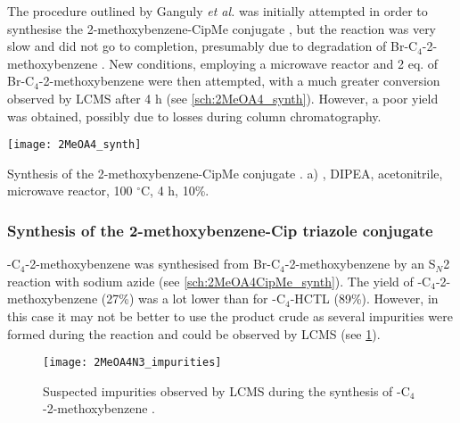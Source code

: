 The procedure outlined by Ganguly \textit{et al.}\cite{Ganguly2011} was initially attempted in order to synthesise the 2-methoxybenzene-CipMe conjugate , but the reaction was very slow and did not go to completion, presumably due to degradation of Br-C$_4$-2-methoxybenzene .
New conditions, employing a microwave reactor and 2 eq. of Br-C$_4$-2-methoxybenzene  were then attempted, with a much greater conversion observed by LCMS after 4 h (see \ref{sch:2MeOA4_synth}). However, a poor yield was obtained, possibly due to losses during column chromatography.

\begin{scheme}[H]
	\begin{center}
		\texttt{[image: 2MeOA4\_synth]}
		\caption{Synthesis of the 2-methoxybenzene-CipMe conjugate . 
		a) , DIPEA, acetonitrile, microwave reactor, 100 $^{\circ}$C, 4 h, 10\%.
		 \label{sch:2MeOA4_synth}}
	\end{center}
\end{scheme}

\subsubsection{Synthesis of the 2-methoxybenzene-Cip triazole conjugate }

-C$_4$-2-methoxybenzene  was synthesised from Br-C$_4$-2-methoxybenzene  by an S$_N$2 reaction with sodium azide (see \ref{sch:2MeOA4CipMe_synth}). The yield of -C$_4$-2-methoxybenzene  (27\%) was a lot lower than for -C$_4$-HCTL  (89\%). However, in this case it may not be better to use the product crude as several impurities were formed during the reaction and could be observed by LCMS (see \ref{fig:2MeOA4N3_impurities}).

\begin{figure}[H]
	\begin{center}
		\texttt{[image: 2MeOA4N3\_impurities]}
		\caption{Suspected impurities observed by LCMS during the synthesis of -C$_4$-2-methoxybenzene .
		\label{fig:2MeOA4N3_impurities}}
	\end{center}
\end{figure}

